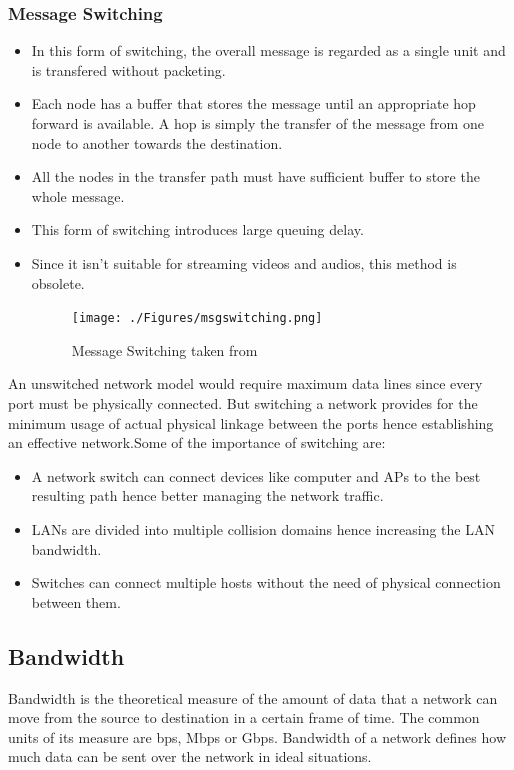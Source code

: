 \documentclass{home_assignment}
\begin{document}
\subsubsection*{Message Switching}
\begin{itemize}
\item In this form of switching, the overall message is regarded as a single unit and is transfered without packeting.
\item Each node has a buffer that stores the message until an appropriate hop forward is available. A hop is simply the transfer of the message from one node to another towards the destination. 
\item All the nodes in the transfer path must have sufficient buffer to store the whole message.
\item This form of switching introduces large queuing delay.
\item Since it isn't suitable for streaming videos and audios, this method is obsolete.
\begin{figure}[H]
\centering
\texttt{[image: ./Figures/msgswitching.png]}
\caption{Message Switching taken from \cite{msgswitching}}
\label{fig:msgswitching}
\end{figure}
\end{itemize}
An unswitched network model would require maximum data lines since every port must be physically connected. But switching a network provides for the minimum usage of actual physical linkage between the ports hence establishing an effective network.Some of the importance of switching are:
\begin{itemize}
\item A network switch can connect devices like computer and APs to the best resulting path hence better managing the network traffic.
\item LANs are divided into multiple collision domains hence increasing the LAN bandwidth.
\item Switches can connect multiple hosts without the need of physical connection between them.
\end{itemize} 
\subsection{Bandwidth}
Bandwidth is the theoretical measure of the amount of data that a network can move from the source to destination in a certain frame of time. The common units of its measure are bps, Mbps or Gbps. Bandwidth of a network defines how much data can be sent over the network in ideal situations.
\end{document}
